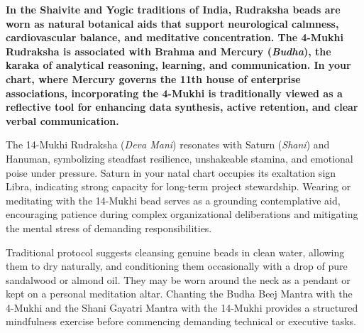 \label{topic60}

{\fontsize{9.5}{13.8}\selectfont\bfseries\color{DeepSlate} In the Shaivite and Yogic traditions of India, Rudraksha beads are worn as natural botanical aids that support neurological calmness, cardiovascular balance, and meditative concentration. The 4-Mukhi Rudraksha is associated with Brahma and Mercury (\textit{Budha}), the karaka of analytical reasoning, learning, and communication. In your chart, where Mercury governs the 11th house of enterprise associations, incorporating the 4-Mukhi is traditionally viewed as a reflective tool for enhancing data synthesis, active retention, and clear verbal communication.}\par\vspace{2mm}

{\fontsize{9}{13}\selectfont The 14-Mukhi Rudraksha (\textit{Deva Mani}) resonates with Saturn (\textit{Shani}) and Hanuman, symbolizing steadfast resilience, unshakeable stamina, and emotional poise under pressure. Saturn in your natal chart occupies its exaltation sign Libra, indicating strong capacity for long-term project stewardship. Wearing or meditating with the 14-Mukhi bead serves as a grounding contemplative aid, encouraging patience during complex organizational deliberations and mitigating the mental stress of demanding responsibilities.}\par\vspace{1.8mm}

{\fontsize{9}{13}\selectfont Traditional protocol suggests cleansing genuine beads in clean water, allowing them to dry naturally, and conditioning them occasionally with a drop of pure sandalwood or almond oil. They may be worn around the neck as a pendant or kept on a personal meditation altar. Chanting the Budha Beej Mantra with the 4-Mukhi and the Shani Gayatri Mantra with the 14-Mukhi provides a structured mindfulness exercise before commencing demanding technical or executive tasks.}\par\vspace{1.8mm}

